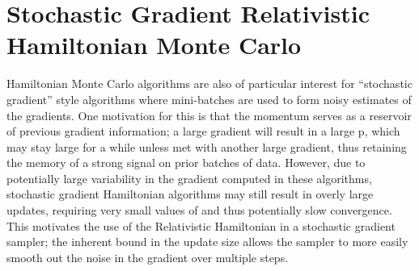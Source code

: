 \section{Stochastic Gradient Relativistic Hamiltonian Monte
Carlo}
Hamiltonian Monte Carlo algorithms are also of particular interest for “stochastic gradient” style algorithms where mini-batches are used to form noisy estimates of the gradients. One motivation
for this is that the momentum serves as a reservoir of previous gradient information; a large gradient will result in a large p, which may stay large for a while unless met with another large gradient, thus retaining the memory of a strong signal on prior batches of data. However, due to potentially large variability in the gradient computed in these algorithms, stochastic
gradient Hamiltonian algorithms may still result in overly large updates, requiring very small values of  and thus potentially slow convergence. This motivates the use of the Relativistic Hamiltonian in a stochastic gradient sampler; the inherent bound in the update size allows the sampler to more easily smooth out the noise in the gradient over multiple steps.

